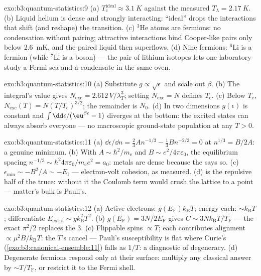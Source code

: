 \begin{solution}{exo:b3:quantum-statistics:9}
(a) $T_{\text{c}}^{\text{ideal}} \approx \qty{3.1}{K}$ against the
measured $T_\lambda = \qty{2.17}{K}$. (b) Liquid helium is dense
and strongly interacting: ``ideal'' drops the interactions that
shift (and reshape) the transition. (c) $^3$He atoms are fermions:
no condensation without pairing; attractive interactions bind
Cooper-like pairs only below \qty{2.6}{mK}, and the paired liquid
then superflows. (d) Nine fermions: $^6$Li is a fermion (while
$^7$Li is a boson) --- the pair of lithium isotopes lets one
laboratory study a Fermi sea and a condensate in the same oven.
\end{solution}

\begin{solution}{exo:b3:quantum-statistics:10}
(a) Substitute $g \propto \sqrt\epsilon$ and scale out $\beta$.
(b) The integral's value gives $N_{\text{exc}} =
2.612\,V/\lambda_T^3$; setting $N_{\text{exc}} = N$ defines
$T_{\text{c}}$. (c) Below $T_{\text{c}}$, $N_{\text{exc}}(T) =
N(T/T_{\text{c}})^{3/2}$; the remainder is $N_0$. (d) In two
dimensions $g(\epsilon)$ is constant and $\int\dd\epsilon/(\eu^{
\beta\epsilon} - 1)$ diverges at the bottom: the excited states
can always absorb everyone --- no macroscopic ground-state
population at any $T > 0$.
\end{solution}

\begin{solution}{exo:b3:quantum-statistics:11}
(a) $\dd\epsilon/\dd n = \tfrac23 An^{-1/3} - \tfrac13 Bn^{-2/3} =
0$ at $n^{1/3} = B/2A$: a genuine minimum. (b) With $A \sim
\hbar^2/m_{\text{e}}$ and $B \sim e^2/4\pi\varepsilon_0$, the
equilibrium spacing $n^{-1/3} \sim \hbar^2 4\pi\varepsilon_0/
m_{\text{e}}e^2 = a_0$: metals are dense because the 
says so. (c) $\epsilon_{\min} \sim -B^2/A \sim -E_{\text{I}}$
--- electron-volt cohesion, as measured. (d) 
is the repulsive half of the truce: without it the Coulomb term
would crush the lattice to a point --- matter's bulk is Pauli's.
\end{solution}

\begin{solution}{exo:b3:quantum-statistics:12}
(a) Active electrons: $g(E_{\text{F}})k_{\text{B}}T$; energy each:
$\sim k_{\text{B}}T$; differentiate $E_{\text{extra}} \sim
g k_{\text{B}}^2T^2$. (b) $g(E_{\text{F}}) = 3N/2E_{\text{F}}$
gives $C \sim 3Nk_{\text{B}}T/T_{\text{F}}$ --- the exact
$\pi^2/2$ replaces the 3. (c) Flippable spins $\propto T$; each
contributes alignment $\propto \mu^2B/k_{\text{B}}T$: the $T$'s
cancel --- Pauli's susceptibility is flat where Curie's
(\cref{exo:b3:canonical-ensemble:11}) falls as $1/T$: a
diagnostic of degeneracy. (d) Degenerate fermions respond only at
their surface: multiply any classical answer by $\sim
T/T_{\text{F}}$, or restrict it to the Fermi shell.
\end{solution}


